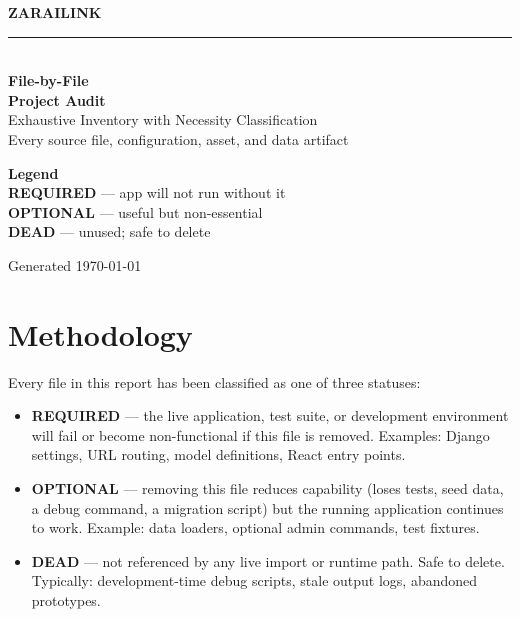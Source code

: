 \documentclass[10pt,a4paper]{article}
\newcommand{\reqBadge}{\textcolor{zarMidGreen}{\textbf{REQUIRED}}}
\newcommand{\optBadge}{\textcolor{zarAmber}{\textbf{OPTIONAL}}}
\newcommand{\deadBadge}{\textcolor{zarRed}{\textbf{DEAD}}}
\begin{document}
\begin{titlepage}
  \centering
  \vspace*{2cm}
  {\color{zarLightGreen}\Large\bfseries ZARAILINK}\\[0.4cm]
  \rule{0.6\linewidth}{0.6pt}\\[1.2cm]
  {\color{zarGreen}\Huge\bfseries File-by-File}\\[0.3cm]
  {\color{zarGreen}\Huge\bfseries Project Audit}\\[1.8cm]
  {\color{zarMidGreen}\Large Exhaustive Inventory with Necessity Classification}\\[0.6cm]
  {\color{zarGray}\large Every source file, configuration, asset, and data artifact}\\[2.8cm]
  \begin{tcolorbox}[
    colback=zarPaleGreen,
    colframe=zarMidGreen,
    width=0.75\linewidth,
    halign=center,
  ]
    \large\textbf{Legend}\\[4pt]
    \reqBadge{} — app will not run without it\\
    \optBadge{} — useful but non-essential\\
    \deadBadge{} — unused; safe to delete
  \end{tcolorbox}
  \vfill
  {\color{zarGray}\small Generated \today}
\end{titlepage}

\renewcommand{\contentsname}{\color{zarGreen}Table of Contents}
\tableofcontents
\newpage

\section{Methodology}

Every file in this report has been classified as one of three statuses:

\begin{itemize}[leftmargin=1.2cm]
  \item \reqBadge{} — the live application, test suite, or development environment
    will fail or become non-functional if this file is removed. Examples: Django
    settings, URL routing, model definitions, React entry points.
  \item \optBadge{} — removing this file reduces capability (loses tests,
    seed data, a debug command, a migration script) but the running application
    continues to work. Example: data loaders, optional admin commands, test fixtures.
  \item \deadBadge{} — not referenced by any live import or runtime path. Safe
    to delete. Typically: development-time debug scripts, stale output logs,
    abandoned prototypes.
\end{itemize}
\end{document}
